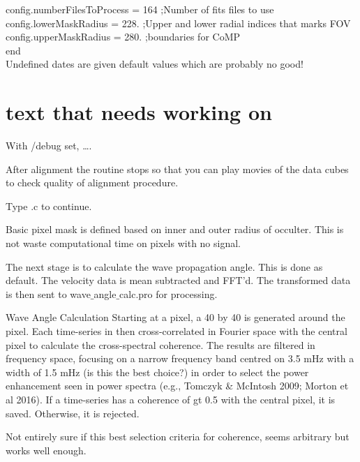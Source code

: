 \documentclass{article}
\begin{document}
 \hspace{1.5cm}      config.numberFilesToProcess = 164                  ;Number of fits files to use\\

 \hspace{1.5cm}      config.lowerMaskRadius = 228.                       ;Upper and lower radial indices that marks FOV\\

 \hspace{1.5cm}      config.upperMaskRadius = 280.                       ;boundaries for CoMP\\

 \hspace{1cm} end\\

Undefined dates are given default values which are probably no good!



\section{text that needs working on}

With /debug set, ….




After alignment the routine stops so that you can play movies of the data cubes to check quality of
alignment procedure.

Type .c to continue.

Basic pixel mask is defined based on inner and outer radius of occulter. This is not waste computational time on pixels with no signal.

The next stage is to calculate the wave propagation angle. This is done as default. The velocity data is mean subtracted and FFT'd. The transformed data is then sent to wave$\_$angle$\_$calc.pro for
processing.

Wave Angle Calculation
Starting at a pixel, a 40 by 40 is generated around the pixel. Each time-series in then cross-correlated in Fourier space with the central pixel to calculate the cross-spectral coherence. The results are filtered in frequency space, focusing on a narrow frequency band centred on 3.5 mHz with a width of 1.5 mHz (is this the best choice?) in order to select the power enhancement seen in power spectra (e.g., Tomczyk \& McIntosh 2009; Morton et al 2016). If a time-series has a coherence of gt 0.5 with the central pixel, it is saved. Otherwise, it is rejected. 

Not entirely sure if this best selection criteria for coherence, seems arbitrary but works well enough.
\end{document}
